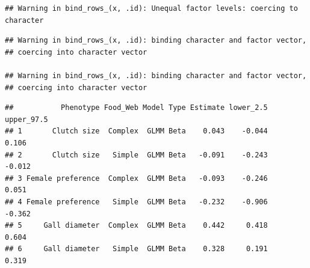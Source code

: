 \documentclass[]{elsarticle} %
\newenvironment{Shaded}{\begin{snugshade}}{\end{snugshade}}
\newcommand{\KeywordTok}[1]{\textcolor[rgb]{0.13,0.29,0.53}{\textbf{#1}}}
\newcommand{\DataTypeTok}[1]{\textcolor[rgb]{0.13,0.29,0.53}{#1}}
\newcommand{\DecValTok}[1]{\textcolor[rgb]{0.00,0.00,0.81}{#1}}
\newcommand{\FloatTok}[1]{\textcolor[rgb]{0.00,0.00,0.81}{#1}}
\newcommand{\StringTok}[1]{\textcolor[rgb]{0.31,0.60,0.02}{#1}}
\newcommand{\ControlFlowTok}[1]{\textcolor[rgb]{0.13,0.29,0.53}{\textbf{#1}}}
\newcommand{\OperatorTok}[1]{\textcolor[rgb]{0.81,0.36,0.00}{\textbf{#1}}}
\newcommand{\NormalTok}[1]{#1}
\begin{document}
\begin{Shaded}
\end{Shaded}

\begin{verbatim}
## Warning in bind_rows_(x, .id): Unequal factor levels: coercing to character
\end{verbatim}

\begin{verbatim}
## Warning in bind_rows_(x, .id): binding character and factor vector,
## coercing into character vector

## Warning in bind_rows_(x, .id): binding character and factor vector,
## coercing into character vector
\end{verbatim}

\begin{verbatim}
##           Phenotype Food_Web Model Type Estimate lower_2.5 upper_97.5
## 1       Clutch size  Complex  GLMM Beta    0.043    -0.044      0.106
## 2       Clutch size   Simple  GLMM Beta   -0.091    -0.243     -0.012
## 3 Female preference  Complex  GLMM Beta   -0.093    -0.246      0.051
## 4 Female preference   Simple  GLMM Beta   -0.232    -0.906     -0.362
## 5     Gall diameter  Complex  GLMM Beta    0.442     0.418      0.604
## 6     Gall diameter   Simple  GLMM Beta    0.328     0.191      0.319
\end{verbatim}
\end{document}
